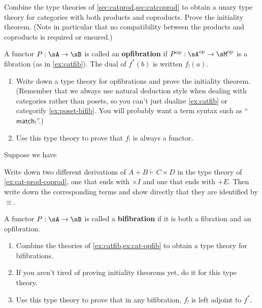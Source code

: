 \documentclass{book}
\let\types\vdash
\def\timesI{\ensuremath{\mathord{\times}I}}
\def\plusE{\mathord{+}E}
\def\match{\mathsf{match}}
\begin{document}
\begin{ex}\label{ex:cat-prod-coprod}
  Combine the type theories of \cref{sec:catprod,sec:catcoprod} to obtain a unary type theory for categories with both products and coproducts.
  Prove the initiality theorem.
  (Note in particular that no compatibility between the products and coproducts is required or ensured.)
\end{ex}

\begin{ex}\label{ex:cat-opfib}
  A functor $P:\sA\to\sB$ is called an \textbf{opfibration} if $P\op:\sA\op\to\sM\op$ is a fibration (as in \cref{ex:catfib}).
  The dual of $f^*(b)$ is written $f_!(a)$.
  \begin{enumerate}
  \item Write down a type theory for opfibrations and prove the initiality theorem.
    (Remember that we always use natural deduction style when dealing with categories rather than posets, so you can't just dualize \cref{ex:catfib} or categorify \cref{ex:poset-bifib}.
    You will probably want a term syntax such as ``$\match_!$''.)
  \item Use this type theory to prove that $f_!$ is always a functor.
  \end{enumerate}
\end{ex}

\begin{ex}\label{ex:cat-prod-coprod-uniq}
  Suppose we have
  Write down two different derivations of $A+B\types C\times D$ in the type theory of \cref{ex:cat-prod-coprod}, one that ends with $\timesI$ and one that ends with $\plusE$.
  Then write down the corresponding terms and show directly that they are identified by $\equiv$.
\end{ex}

\begin{ex}\label{ex:cat-bifib}
  A functor $P:\sA\to\sB$ is called a \textbf{bifibration} if it is both a fibration and an opfibration.
  \begin{enumerate}
  \item Combine the theories of \cref{ex:catfib,ex:cat-opfib} to obtain a type theory for bifibrations.
  \item If you aren't tired of proving initiality theorems yet, do it for this type theory.
  \item Use this type theory to prove that in any bifibration, $f_!$ is left adjoint to $f^*$.
  \end{enumerate}
\end{ex}
\end{document}
